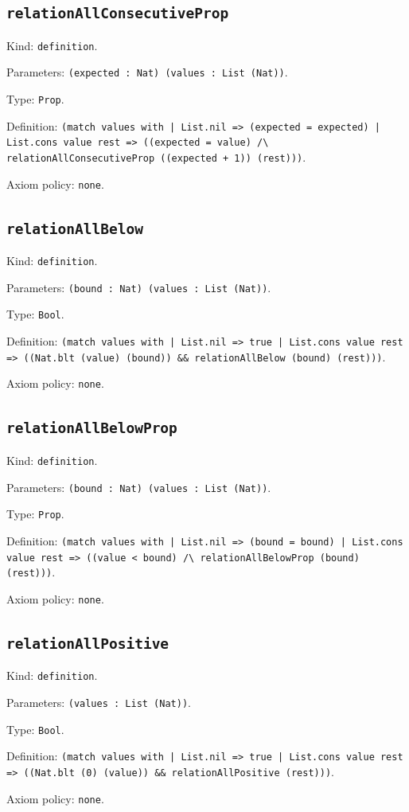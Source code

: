 \documentclass[11pt]{article}
\begin{document}
\subsection*{\texttt{relationAllConsecutiveProp}}
\noindent Kind: \texttt{definition}.\par
\noindent Parameters: \texttt{(expected : Nat) (values : List (Nat))}.\par
\noindent Type: \texttt{Prop}.\par
\noindent Definition: \texttt{(match values with | List.nil => (expected = expected) | List.cons value rest => ((expected = value) /\textbackslash{} relationAllConsecutiveProp ((expected + 1)) (rest)))}.\par
\noindent Axiom policy: \texttt{none}.\par
\subsection*{\texttt{relationAllBelow}}
\noindent Kind: \texttt{definition}.\par
\noindent Parameters: \texttt{(bound : Nat) (values : List (Nat))}.\par
\noindent Type: \texttt{Bool}.\par
\noindent Definition: \texttt{(match values with | List.nil => true | List.cons value rest => ((Nat.blt (value) (bound)) \&\& relationAllBelow (bound) (rest)))}.\par
\noindent Axiom policy: \texttt{none}.\par
\subsection*{\texttt{relationAllBelowProp}}
\noindent Kind: \texttt{definition}.\par
\noindent Parameters: \texttt{(bound : Nat) (values : List (Nat))}.\par
\noindent Type: \texttt{Prop}.\par
\noindent Definition: \texttt{(match values with | List.nil => (bound = bound) | List.cons value rest => ((value < bound) /\textbackslash{} relationAllBelowProp (bound) (rest)))}.\par
\noindent Axiom policy: \texttt{none}.\par
\subsection*{\texttt{relationAllPositive}}
\noindent Kind: \texttt{definition}.\par
\noindent Parameters: \texttt{(values : List (Nat))}.\par
\noindent Type: \texttt{Bool}.\par
\noindent Definition: \texttt{(match values with | List.nil => true | List.cons value rest => ((Nat.blt (0) (value)) \&\& relationAllPositive (rest)))}.\par
\noindent Axiom policy: \texttt{none}.\par
\end{document}
